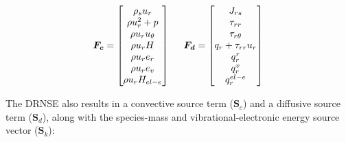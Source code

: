 \documentclass[10pt]{article}
\begin{document}
\begin{flushleft}
\begin{equation}
    \boldsymbol{F_c} = \begin{bmatrix}
        \rho_s u_r\\
        \rho u_r^2 + p \\
        \rho u_r u_\theta \\
        \rho u_r H \\
        \rho u_r e_r \\
        \rho u_r e_v \\
        \rho u_r H_{el-e} 
    \end{bmatrix}
        \hspace{5mm} 
    \boldsymbol{F_d} = \begin{bmatrix}
        J_{rs} \\ 
        \tau_{rr} \\ 
        \tau_{r\theta} \\ 
        q_r + \tau_{rr} u_r \\ 
        q_r^r \\
        q_r^v \\
        q_r^{el-e}
    \end{bmatrix}
\end{equation}

The DRNSE also results in a convective source term ($\boldsymbol{S}_c$) and a diffusive source term ($\boldsymbol{S}_d$), along with the species-mass and vibrational-electronic energy source vector ($\boldsymbol{S}_k$):


\end{flushleft}
\end{document}
